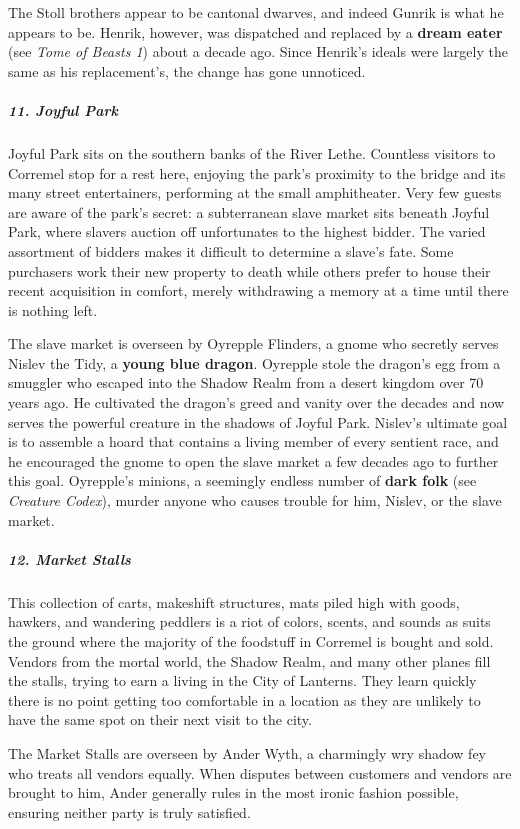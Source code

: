 \documentclass[10pt,a4paper,twoside,bg=print,twocolumn,openany,nodeprecatedcode]{dndbook}
\begin{document}
The Stoll brothers appear to be cantonal dwarves, and indeed Gunrik is what he appears to be. Henrik, however, was dispatched and replaced by a \textbf{dream eater} (see \textit{Tome of Beasts 1}) about a decade ago. Since Henrik's ideals were largely the same as his replacement's, the change has gone unnoticed.

\subparagraph{11. Joyful Park}
Joyful Park sits on the southern banks of the River Lethe. Countless visitors to Corremel stop for a rest here, enjoying the park's proximity to the bridge and its many street entertainers, performing at the small amphitheater. Very few guests are aware of the park's secret: a subterranean slave market sits beneath Joyful Park, where slavers auction off unfortunates to the highest bidder. The varied assortment of bidders makes it difficult to determine a slave's fate. Some purchasers work their new property to death while others prefer to house their recent acquisition in comfort, merely withdrawing a memory at a time until there is nothing left.

The slave market is overseen by Oyrepple Flinders, a gnome who secretly serves Nislev the Tidy, a \textbf{young blue dragon}. Oyrepple stole the dragon's egg from a smuggler who escaped into the Shadow Realm from a desert kingdom over 70 years ago. He cultivated the dragon's greed and vanity over the decades and now serves the powerful creature in the shadows of Joyful Park. Nislev's ultimate goal is to assemble a hoard that contains a living member of every sentient race, and he encouraged the gnome to open the slave market a few decades ago to further this goal. Oyrepple's minions, a seemingly endless number of \textbf{dark folk} (see \textit{Creature Codex}), murder anyone who causes trouble for him, Nislev, or the slave market.

\subparagraph{12. Market Stalls}
This collection of carts, makeshift structures, mats piled high with goods, hawkers, and wandering peddlers is a riot of colors, scents, and sounds as suits the ground where the majority of the foodstuff in Corremel is bought and sold. Vendors from the mortal world, the Shadow Realm, and many other planes fill the stalls, trying to earn a living in the City of Lanterns. They learn quickly there is no point getting too comfortable in a location as they are unlikely to have the same spot on their next visit to the city.

The Market Stalls are overseen by Ander Wyth, a charmingly wry shadow fey who treats all vendors equally. When disputes between customers and vendors are brought to him, Ander generally rules in the most ironic fashion possible, ensuring neither party is truly satisfied.
\end{document}
